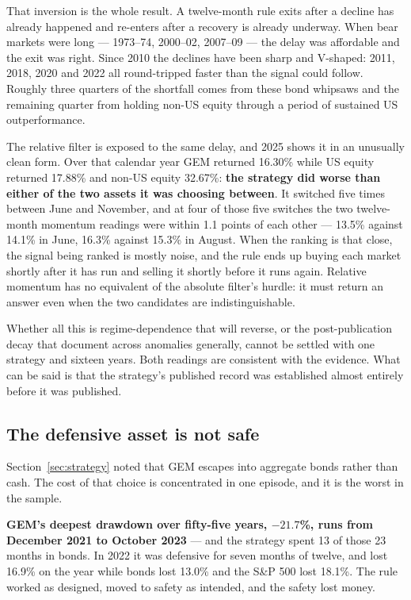 \documentclass[11pt,a4paper]{article}
\let\oldsubsection\subsection
\renewcommand{\subsection}{\FloatBarrier\oldsubsection}
\begin{document}
That inversion is the whole result. A twelve-month rule exits after a decline
has already happened and re-enters after a recovery is already underway. When
bear markets were long --- 1973--74, 2000--02, 2007--09 --- the delay was
affordable and the exit was right. Since 2010 the declines have been sharp and
V-shaped: 2011, 2018, 2020 and 2022 all round-tripped faster than the signal
could follow. Roughly three quarters of the shortfall comes from these bond
whipsaws and the remaining quarter from holding non-US equity through a period
of sustained US outperformance.

The relative filter is exposed to the same delay, and 2025 shows it in an
unusually clean form. Over that calendar year GEM returned 16.30\% while US
equity returned 17.88\% and non-US equity 32.67\%: \textbf{the strategy did
worse than either of the two assets it was choosing between}. It switched five
times between June and November, and at four of those five switches the two
twelve-month momentum readings were within 1.1 points of each other --- 13.5\%
against 14.1\% in June, 16.3\% against 15.3\% in August. When the ranking is
that close, the signal being ranked is mostly noise, and the rule ends up
buying each market shortly after it has run and selling it shortly before it
runs again. Relative momentum has no equivalent of the absolute filter's
hurdle: it must return an answer even when the two candidates are
indistinguishable.

Whether all this is regime-dependence that will reverse, or the post-publication
decay that \citet{mclean2016} document across anomalies generally, cannot be
settled with one strategy and sixteen years. Both readings are consistent with
the evidence. What can be said is that the strategy's published record was
established almost entirely before it was published.

\subsection{The defensive asset is not safe}

Section~\ref{sec:strategy} noted that GEM escapes into aggregate bonds rather
than cash. The cost of that choice is concentrated in one episode, and it is
the worst in the sample.

\textbf{GEM's deepest drawdown over fifty-five years, $-21.7$\%, runs from
December 2021 to October 2023} --- and the strategy spent 13 of those 23 months
in bonds. In 2022 it was defensive for seven months of twelve, and lost 16.9\%
on the year while bonds lost 13.0\% and the S\&P 500 lost 18.1\%. The rule
worked as designed, moved to safety as intended, and the safety lost money.
\end{document}
